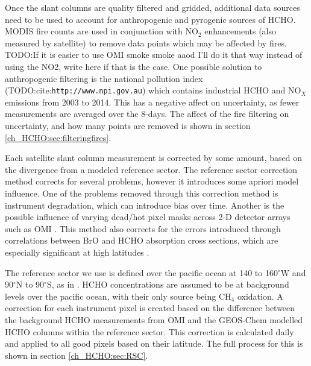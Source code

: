     Once the slant columns are quality filtered and gridded, additional data sources need to be used to account for anthropogenic and pyrogenic sources of HCHO.
    MODIS fire counts are used in conjunction with NO$_2$ enhancements (also measured by satellite) to remove data points which may be affected by fires. 
    TODO:If it is easier to use OMI smoke smoke aaod I'll do it that way instead of using the NO2, write here if that is the case.
    One possible solution to anthropogenic filtering is the national pollution index (TODO:cite:\verb|http://www.npi.gov.au|) which contains industrial HCHO and NO$_X$ emissions from 2003 to 2014.
    This has a negative affect on uncertainty, as fewer measurements are averaged over the 8-days. 
    The affect of the fire filtering on uncertainty, and how many points are removed is shown in section \ref{ch_HCHO:sec:filteringfires}.
    
    Each satellite slant column measurement is corrected by some amount, based on the divergence from a modeled reference sector.
    The reference sector correction method corrects for several problems, however it introduces some apriori model influence.
    One of the problems removed through this correction method is instrument degradation, which can introduce bias over time.
    Another is the possible influence of varying dead/hot pixel masks across 2-D detector arrays such as OMI \citep{DeSmedt2015}.
    This method also corrects for the errors introduced through correlations between BrO and HCHO absorption cross sections, which are especially significant at high latitudes \citep{Abad2015}.
    
    The reference sector we use is defined over the pacific ocean at 140 to 160$^{\circ}$W and 90$^{\circ}$N to 90$^{\circ}$S, as in \citet{Abad2015}.
    HCHO concentrations are assumed to be at background levels over the pacific ocean, with their only source being CH$_4$ oxidation.
    A correction for each instrument pixel is created based on the difference between the background HCHO measurements from OMI and the GEOS-Chem modelled HCHO columns within the reference sector.
    This correction is calculated daily and applied to all good pixels based on their latitude.
    The full process for this is shown in section \ref{ch_HCHO:sec:RSC}.
    
